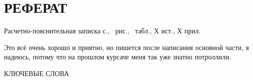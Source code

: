 \section*{РЕФЕРАТ}

Расчетно-пояснительная записка \pageref{LastPage} с., \totalfigures\ рис., \totaltables\ табл., Х ист., Х прил.

Это всё очень хорошо и приятно, но пишется после написания основной части, я надеюсь, потому что на прошлом курсаче меня так уже знатно потроллили.

КЛЮЧЕВЫЕ СЛОВА

\pagebreak
